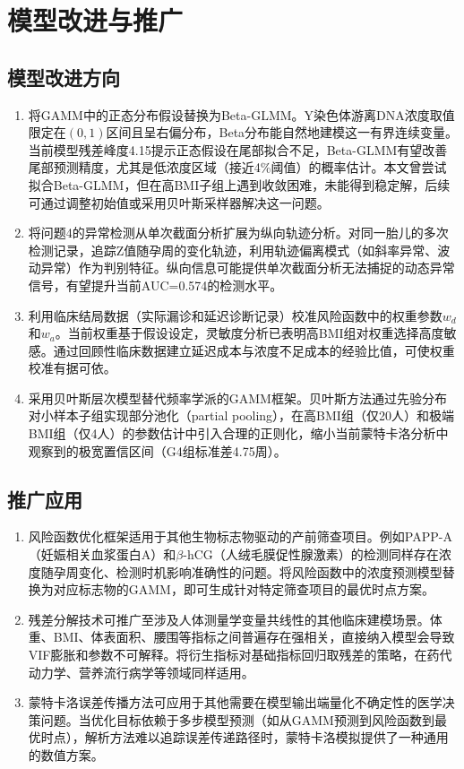 \section{模型改进与推广}

\subsection{模型改进方向}

\begin{enumerate}[label=（\arabic*）]
\item 将GAMM中的正态分布假设替换为Beta-GLMM。Y染色体游离DNA浓度取值限定在$(0,1)$区间且呈右偏分布，Beta分布能自然地建模这一有界连续变量。当前模型残差峰度4.15提示正态假设在尾部拟合不足，Beta-GLMM有望改善尾部预测精度，尤其是低浓度区域（接近4\%阈值）的概率估计。本文曾尝试拟合Beta-GLMM，但在高BMI子组上遇到收敛困难，未能得到稳定解，后续可通过调整初始值或采用贝叶斯采样器解决这一问题。

\item 将问题4的异常检测从单次截面分析扩展为纵向轨迹分析。对同一胎儿的多次检测记录，追踪Z值随孕周的变化轨迹，利用轨迹偏离模式（如斜率异常、波动异常）作为判别特征。纵向信息可能提供单次截面分析无法捕捉的动态异常信号，有望提升当前AUC=0.574的检测水平。

\item 利用临床结局数据（实际漏诊和延迟诊断记录）校准风险函数中的权重参数$w_d$和$w_a$。当前权重基于假设设定，灵敏度分析已表明高BMI组对权重选择高度敏感。通过回顾性临床数据建立延迟成本与浓度不足成本的经验比值，可使权重校准有据可依。

\item 采用贝叶斯层次模型替代频率学派的GAMM框架。贝叶斯方法通过先验分布对小样本子组实现部分池化（partial pooling），在高BMI组（仅20人）和极端BMI组（仅4人）的参数估计中引入合理的正则化，缩小当前蒙特卡洛分析中观察到的极宽置信区间（G4组标准差4.75周）。
\end{enumerate}

\subsection{推广应用}

\begin{enumerate}[label=（\arabic*）]
\item 风险函数优化框架适用于其他生物标志物驱动的产前筛查项目。例如PAPP-A（妊娠相关血浆蛋白A）和$\beta$-hCG（人绒毛膜促性腺激素）的检测同样存在浓度随孕周变化、检测时机影响准确性的问题。将风险函数中的浓度预测模型替换为对应标志物的GAMM，即可生成针对特定筛查项目的最优时点方案。

\item 残差分解技术可推广至涉及人体测量学变量共线性的其他临床建模场景。体重、BMI、体表面积、腰围等指标之间普遍存在强相关，直接纳入模型会导致VIF膨胀和参数不可解释。将衍生指标对基础指标回归取残差的策略，在药代动力学、营养流行病学等领域同样适用。

\item 蒙特卡洛误差传播方法可应用于其他需要在模型输出端量化不确定性的医学决策问题。当优化目标依赖于多步模型预测（如从GAMM预测到风险函数到最优时点），解析方法难以追踪误差传递路径时，蒙特卡洛模拟提供了一种通用的数值方案。
\end{enumerate}
